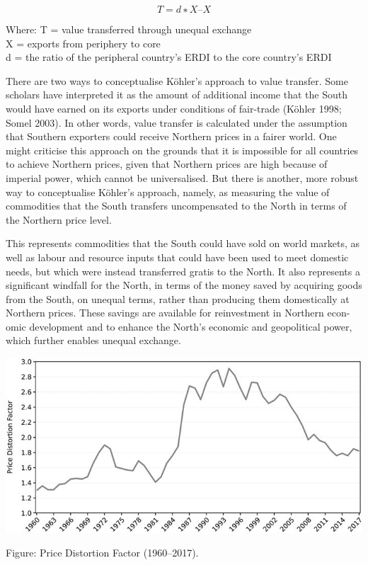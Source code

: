 \documentclass[
]{book}
\begin{document}
\[T = d∗X –X\]

Where:
T = value transferred through unequal exchange\\
X = exports from periphery to core\\
d = the ratio of the peripheral country's ERDI to the core country's ERDI

There are two ways to conceptualise Köhler's approach to value transfer. Some scholars have
interpreted it as the amount of additional income that the South would have earned on its
exports under conditions of fair-trade (Köhler 1998; Somel 2003). In other words, value transfer is
calculated under the assumption that Southern exporters could receive Northern prices in a fairer
world. One might criticise this approach on the grounds that it is impossible for all countries to
achieve Northern prices, given that Northern prices are high because of imperial power, which
cannot be universalised. But there is another, more robust way to conceptualise Köhler's approach,
namely, as measuring the value of commodities that the South transfers uncompensated to the
North in terms of the Northern price level.

This represents commodities that the South could have sold on world markets, as well as labour
and resource inputs that could have been used to meet domestic needs, but which were instead
transferred gratis to the North. It also represents a significant windfall for the North, in terms of
the money saved by acquiring goods from the South, on unequal terms, rather than producing
them domestically at Northern prices. These savings are available for reinvestment in Northern econ-
omic development and to enhance the North's economic and geopolitical power, which further
enables unequal exchange.

\includegraphics{fig/Hickel_Price_Distortion_Factor.png}

Figure: Price Distortion Factor (1960--2017).
\end{document}
